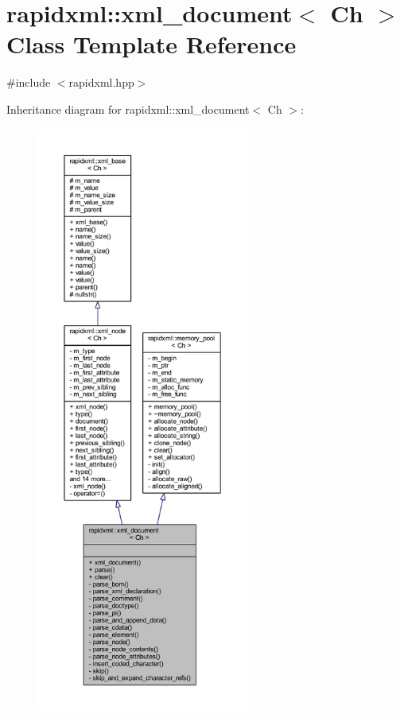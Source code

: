 \hypertarget{singletonrapidxml_1_1xml__document}{\section{rapidxml\+:\+:xml\+\_\+document$<$ Ch $>$ Class Template Reference}
\label{singletonrapidxml_1_1xml__document}
}


{\ttfamily \#include $<$rapidxml.\+hpp$>$}



Inheritance diagram for rapidxml\+:\+:xml\+\_\+document$<$ Ch $>$\+:\nopagebreak
\begin{figure}[H]
\begin{center}
\leavevmode
\includegraphics[height=550pt]{singletonrapidxml_1_1xml__document__inherit__graph}
\end{center}
\end{figure}


